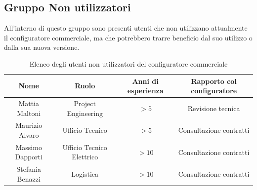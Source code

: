 \documentclass[12pt, a4paper]{article} %
\begin{document}
\subsection{Gruppo Non utilizzatori}
All'interno di questo gruppo sono presenti utenti che non utilizzano
attualmente il configuratore commerciale, ma che potrebbero trarre beneficio
dal suo utilizzo o dalla sua nuova versione.
\begin{table}[!ht]
    \centering
    \begin{tabular}{|c|c|c|c|}
        \hline
        Nome             & Ruolo                     & Anni di esperienza & Rapporto col configuratore \\
        \hline
        Mattia Maltoni   & Project Engineering       & \(>5\)               & Revisione tecnica          \\
        \hline
        Maurizio Alvaro  & Ufficio Tecnico           & \(>5\)               & Consultazione contratti    \\
        \hline
        Massimo Dapporti & Ufficio Tecnico Elettrico & \(>10\)              & Consultazione contratti    \\
        \hline
        Stefania Benazzi & Logistica                 & \(>10\)              & Consultazione contratti    \\
        \hline
    \end{tabular}\label{TableNonVendor}
    \caption{Elenco degli utenti non utilizzatori del configuratore commerciale}
\end{table}
\end{document}
